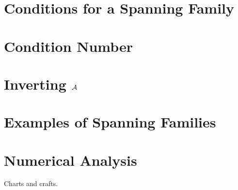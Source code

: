 
\section{Conditions for a Spanning Family}

\label{sec:span_fam}
\section{Condition Number}
\label{sec:con_number}

\section{Inverting $\mathcal{A}$}
\label{sec:meas_expl_inv}

\section{Examples of Spanning Families}
\label{sec:span_fam_ex}

\section{Numerical Analysis}
\label{sec:span_fam_num}
Charts and crafts.
